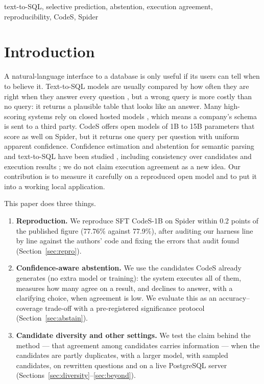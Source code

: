 \documentclass[conference]{IEEEtran}
\begin{document}
\begin{IEEEkeywords}
text-to-SQL, selective prediction, abstention, execution agreement, reproducibility, CodeS, Spider
\end{IEEEkeywords}

\section{Introduction}
A natural-language interface to a database is only useful if its users can tell when to believe it. Text-to-SQL models are usually compared by how often they are right when they answer every question \cite{deng2022recent, hong2024nextgeneration}, but a wrong query is more costly than no query: it returns a plausible table that looks like an answer. Many high-scoring systems rely on closed hosted models \cite{pourreza2023dinsql, gao2023texttosql, pourreza2024chasesql}, which means a company's schema is sent to a third party. CodeS \cite{li2024codes} offers open models of 1B to 15B parameters that score as well on Spider, but it returns one query per question with uniform apparent confidence. Confidence estimation and abstention for semantic parsing and text-to-SQL have been studied \cite{stengel2023calibrated, somov2025confidence, lee2024trustsql, maleki2025confidence}, including consistency over candidates and execution results \cite{maleki2025confidence, borchmann2025query}; we do not claim execution agreement as a new idea. Our contribution is to measure it carefully on a reproduced open model and to put it into a working local application.

This paper does three things.
\begin{enumerate}
\item \textbf{Reproduction.} We reproduce SFT CodeS-1B on Spider \cite{yu2018spider} within 0.2 points of the published figure (77.76\% against 77.9\%), after auditing our harness line by line against the authors' code and fixing the errors that audit found (Section~\ref{sec:repro}).
\item \textbf{Confidence-aware abstention.} We use the candidates CodeS already generates (no extra model or training): the system executes all of them, measures how many agree on a result, and declines to answer, with a clarifying choice, when agreement is low. We evaluate this as an accuracy--coverage trade-off with a pre-registered significance protocol (Section~\ref{sec:abstain}).
\item \textbf{Candidate diversity and other settings.} We test the claim behind the method --- that agreement among candidates carries information --- when the candidates are partly duplicates, with a larger model, with sampled candidates, on rewritten questions and on a live PostgreSQL server (Sections~\ref{sec:diversity}--\ref{sec:beyond}).
\end{enumerate}
\end{document}
